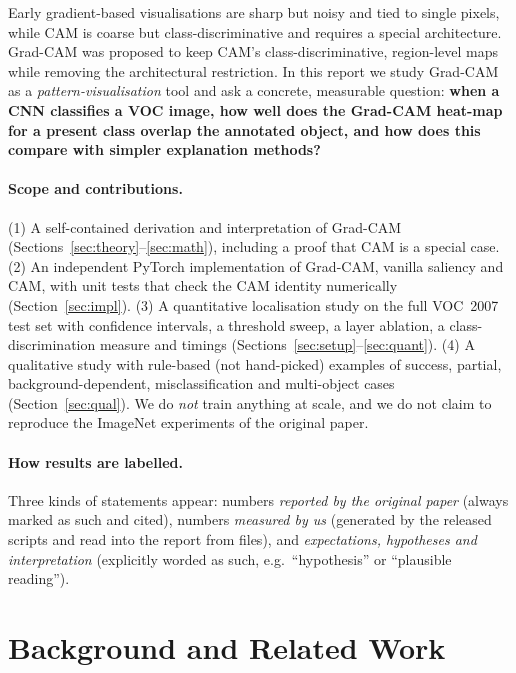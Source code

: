\documentclass[11pt,a4paper]{article}
\newcommand{\GC}{Grad-CAM}
\begin{document}
Early gradient-based visualisations are sharp but noisy and tied to single pixels, while CAM is coarse but class-discriminative and requires a special architecture.
\GC{} was proposed to keep CAM's class-discriminative, region-level maps while removing the architectural restriction.
In this report we study \GC{} as a \emph{pattern-visualisation} tool and ask a concrete, measurable question: \textbf{when a CNN classifies a VOC image, how well does the \GC{} heat-map for a present class overlap the annotated object, and how does this compare with simpler explanation methods?}

\paragraph{Scope and contributions.}
(1) A self-contained derivation and interpretation of \GC{} (Sections~\ref{sec:theory}--\ref{sec:math}), including a proof that CAM is a special case. (2) An independent PyTorch implementation of \GC, vanilla saliency and CAM, with unit tests that check the CAM identity numerically (Section~\ref{sec:impl}). (3) A quantitative localisation study on the full VOC~2007 test set with confidence intervals, a threshold sweep, a layer ablation, a class-discrimination measure and timings (Sections~\ref{sec:setup}--\ref{sec:quant}). (4) A qualitative study with rule-based (not hand-picked) examples of success, partial, background-dependent, misclassification and multi-object cases (Section~\ref{sec:qual}). We do \emph{not} train anything at scale, and we do not claim to reproduce the ImageNet experiments of the original paper.

\paragraph{How results are labelled.}
Three kinds of statements appear: numbers \emph{reported by the original paper} (always marked as such and cited), numbers \emph{measured by us} (generated by the released scripts and read into the report from files), and \emph{expectations, hypotheses and interpretation} (explicitly worded as such, e.g.\ ``hypothesis'' or ``plausible reading'').

\section{Background and Related Work}
\end{document}
